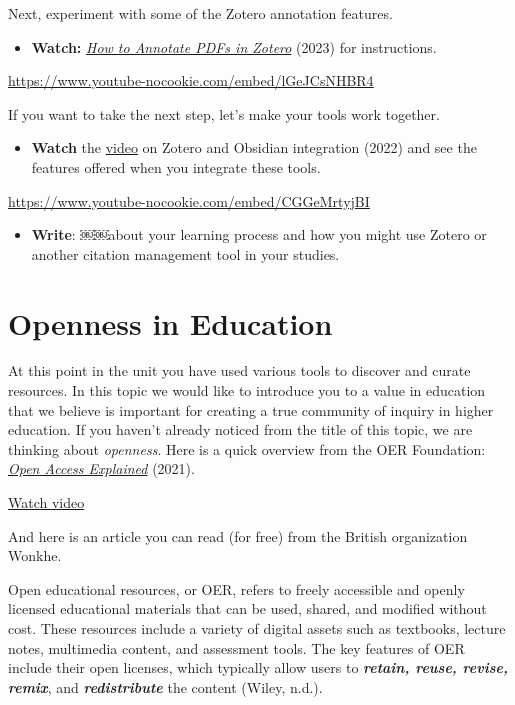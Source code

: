 \documentclass[
  letterpaper,
  DIV=11,
  numbers=noendperiod]{scrreprt}
\providecommand{\tightlist}{%
  \setlength{\itemsep}{0pt}\setlength{\parskip}{0pt}}\usepackage{longtable,booktabs,array}
\begin{document}
\begin{tcolorbox}
Next, experiment with some of the Zotero annotation features.

\begin{itemize}
\tightlist
\item
  \textbf{Watch:}
  \href{https://www.youtube.com/watch?v=lGeJCsNHBR4}{\emph{How to
  Annotate PDFs in Zotero}} (2023) for instructions.
\end{itemize}

\url{https://www.youtube-nocookie.com/embed/lGeJCsNHBR4}

If you want to take the next step, let's make your tools work together.

\begin{itemize}
\tightlist
\item
  \textbf{Watch} the
  \href{https://www.youtube.com/watch?v=CGGeMrtyjBI?}{video} on Zotero
  and Obsidian integration (2022) and see the features offered when you
  integrate these tools.
\end{itemize}

\url{https://www.youtube-nocookie.com/embed/CGGeMrtyjBI}

\begin{itemize}
\tightlist
\item
  \textbf{Write}: ￼￼about your learning process and how you might use
  Zotero or another citation management tool in your studies.
\end{itemize}

\end{tcolorbox}

\section{Openness in Education}\label{openness-in-education}

At this point in the unit you have used various tools to discover and
curate resources. In this topic we would like to introduce you to a
value in education that we believe is important for creating a true
community of inquiry in higher education. If you haven't already noticed
from the title of this topic, we are thinking about \emph{openness}.
Here is a quick overview from the OER Foundation:
\emph{\href{https://vimeo.com/557927481}{Open Access Explained}} (2021).

\href{https://vimeo.com/557927481}{Watch video}

And here is an article you can read (for free) from the British
organization Wonkhe.

Open educational resources, or OER, refers to freely accessible and
openly licensed educational materials that can be used, shared, and
modified without cost. These resources include a variety of digital
assets such as textbooks, lecture notes, multimedia content, and
assessment tools. The key features of OER include their open licenses,
which typically allow users to \textbf{\emph{retain, reuse, revise,
remix}}, and \textbf{\emph{redistribute}} the content (Wiley, n.d.).
\end{document}
